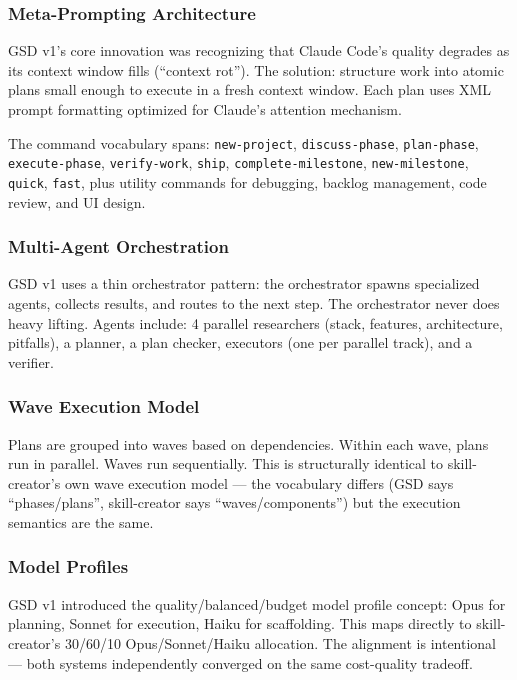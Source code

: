 \documentclass[11pt,letterpaper]{article}
\begin{document}
\subsubsection{Meta-Prompting Architecture}

GSD v1's core innovation was recognizing that Claude Code's quality degrades as its context window fills (``context rot''). The solution: structure work into atomic plans small enough to execute in a fresh context window. Each plan uses XML prompt formatting optimized for Claude's attention mechanism.

The command vocabulary spans: \texttt{new-project}, \texttt{discuss-phase}, \texttt{plan-phase}, \texttt{execute-phase}, \texttt{verify-work}, \texttt{ship}, \texttt{complete-milestone}, \texttt{new-milestone}, \texttt{quick}, \texttt{fast}, plus utility commands for debugging, backlog management, code review, and UI design.

\subsubsection{Multi-Agent Orchestration}

GSD v1 uses a thin orchestrator pattern: the orchestrator spawns specialized agents, collects results, and routes to the next step. The orchestrator never does heavy lifting. Agents include: 4 parallel researchers (stack, features, architecture, pitfalls), a planner, a plan checker, executors (one per parallel track), and a verifier.

\subsubsection{Wave Execution Model}

Plans are grouped into waves based on dependencies. Within each wave, plans run in parallel. Waves run sequentially. This is structurally identical to skill-creator's own wave execution model --- the vocabulary differs (GSD says ``phases/plans'', skill-creator says ``waves/components'') but the execution semantics are the same.

\subsubsection{Model Profiles}

GSD v1 introduced the quality/balanced/budget model profile concept: Opus for planning, Sonnet for execution, Haiku for scaffolding. This maps directly to skill-creator's 30/60/10 Opus/Sonnet/Haiku allocation. The alignment is intentional --- both systems independently converged on the same cost-quality tradeoff.
\end{document}
